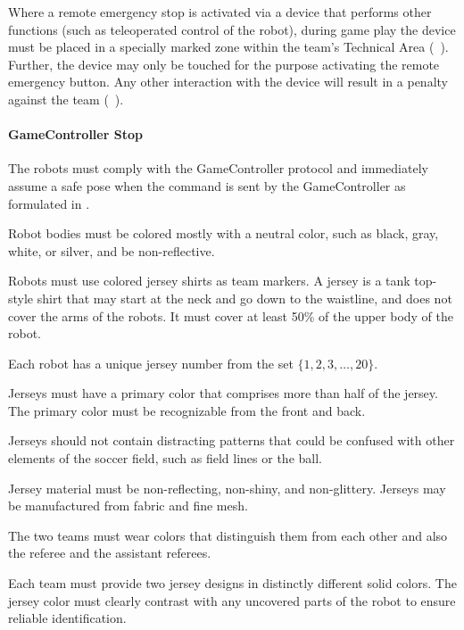 Where a remote emergency stop is activated via a device that performs other functions (such as teleoperated control of the robot), during game play the device must be placed in a specially marked zone within the team's Technical Area (\cf~). Further, the device may only be touched for the purpose activating the remote emergency button.  Any other interaction with the device will result in a penalty against the team (\cf~).

\paragraph{GameController Stop}
The robots must comply with the GameController protocol and immediately assume a safe pose when the command is sent by the GameController as formulated in .








\label{sec:team_markers}

Robot bodies must be colored mostly with a neutral color, such as black, gray, white, or silver, and be non-reflective.

Robots must use colored jersey shirts as team markers. A jersey is a tank top-style shirt that may start at the neck and go down to the waistline, and does not cover the arms of the robots. It must cover at least 50\% of the upper body of the robot.  

Each robot has a unique jersey number from the set $\{1, 2, 3, \ldots, 20\}$. 

Jerseys must have a primary color that comprises more than half of the jersey. The primary color must be recognizable from the front and back.

Jerseys should not contain distracting patterns that could be confused with other elements of the soccer field, such as field lines or the ball.

Jersey material must be non-reflecting, non-shiny, and non-glittery. Jerseys may be manufactured from fabric and fine mesh.

The two teams must wear colors that distinguish them from each other and also the referee and the assistant referees.

Each team must provide two jersey designs in distinctly different solid colors. The jersey color must clearly contrast with any uncovered parts of the robot to ensure reliable identification.


